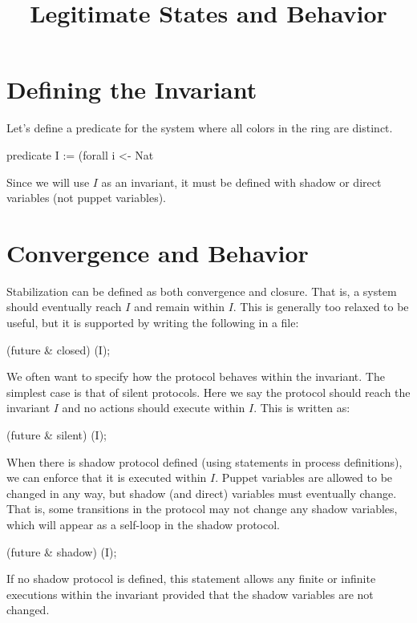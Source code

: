 
\title{Legitimate States and Behavior}
\date{}



\tableofcontents

\section{Defining the Invariant}

Let's define a predicate for the system where all colors in the ring are distinct.
\begin{code}
predicate I := (forall i <- Nat %
\end{code}

Since we will use $I$ as an invariant, it must be defined with shadow or direct variables (not puppet variables).

\section{Convergence and Behavior}

Stabilization can be defined as both convergence and closure.
That is, a system should eventually reach $I$ and remain within $I$.
This is generally too relaxed to be useful, but it is supported by writing the following in a  file:
\begin{code}
(future & closed) (I);
\end{code}

We often want to specify how the protocol behaves within the invariant.
The simplest case is that of silent protocols.
Here we say the protocol should reach the invariant $I$ and no actions should execute within $I$.
This is written as:
\begin{code}
(future & silent) (I);
\end{code}

When there is shadow protocol defined (using  statements in process definitions), we can enforce that it is executed within $I$.
Puppet variables are allowed to be changed in any way, but shadow (and direct) variables must eventually change.
That is, some transitions in the protocol may not change any shadow variables, which will appear as a self-loop in the shadow protocol.
\begin{code}
(future & shadow) (I);
\end{code}
If no shadow protocol is defined, this statement allows any finite or infinite executions within the invariant provided that the shadow variables are not changed.

